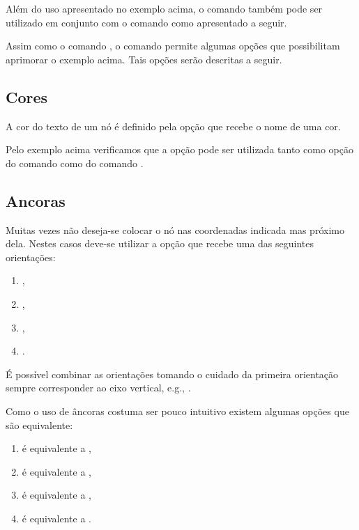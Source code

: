 
Al\'{e}m do uso apresentado no exemplo acima, o comando  tamb\'{e}m pode ser utilizado em conjunto com o comando  como apresentado a seguir.


Assim como o comando , o comando  permite algumas op\c{c}\~{o}es que possibilitam aprimorar o exemplo acima. Tais op\c{c}\~{o}es ser\~{a}o descritas a seguir.

\subsection{Cores}
A cor do texto de um n\'{o} \'{e} definido pela op\c{c}\~{a}o  que recebe o nome de uma cor.


Pelo exemplo acima verificamos que a op\c{c}\~{a}o  pode ser utilizada tanto como op\c{c}\~{a}o do comando  como do comando .

\subsection{Ancoras}
Muitas vezes n\~{a}o deseja-se colocar o n\'{o} nas coordenadas indicada mas pr\'{o}ximo dela. Nestes casos deve-se utilizar a op\c{c}\~{a}o  que recebe uma das seguintes orienta\c{c}\~{o}es:
\begin{enumerate}
    \item {},
    \item {},
    \item {},
    \item {}.
\end{enumerate}

\'{E} poss\'{i}vel combinar as orienta\c{c}\~{o}es tomando o cuidado da primeira orienta\c{c}\~{a}o sempre corresponder ao eixo vertical, e.g., .


Como o uso de \^{a}ncoras costuma ser pouco intuitivo existem algumas op\c{c}\~{o}es que s\~{a}o equivalente:
\begin{enumerate}
    \item {} \'{e} equivalente a ,
    \item {} \'{e} equivalente a ,
    \item {} \'{e} equivalente a ,
    \item {} \'{e} equivalente a .
\end{enumerate}

